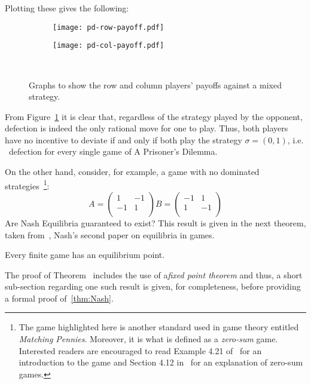 Plotting these gives the following:
\begin{figure}[h]
    \centering
        \begin{subfigure}[t]{0.45\textwidth}
        \centering
            \texttt{[image: pd-row-payoff.pdf]}
        \end{subfigure}
    \hfill
        \begin{subfigure}[t]{0.45\textwidth}
        \centering
            \texttt{[image: pd-col-payoff.pdf]}
        \end{subfigure}~\caption{Graphs to show the row and column players' payoffs against a 
        mixed strategy.}\label{fig:mixed_strategy_PD}
    \end{figure}
From Figure~\ref{fig:mixed_strategy_PD} it is clear that, regardless of the
strategy played by the opponent, defection is indeed the only rational move for
one to play. Thus, both players have no incentive to deviate if and only if both
play the strategy \(\sigma=(0, 1)\), i.e. \ defection for every single game of A
Prisoner's Dilemma.

On the other hand, consider, for example, a game with no dominated
strategies~\footnote{The game highlighted here is another standard used in game
theory entitled \emph{Matching Pennies}. Moreover, it is what is defined as a
\emph{zero-sum} game. Interested readers are encouraged to read Example 4.21
of~\cite{Webb2007} for an introduction to the game and Section 4.12
in~\cite{maschler_solan_zamir_2013} for an explanation of zero-sum games.}:
\[
    A =
    \begin{pmatrix}
        1 & -1\\
        -1 & 1\\
    \end{pmatrix}

    B =
    \begin{pmatrix}
        -1 & 1\\
        1 & -1\\
    \end{pmatrix}
\]
Are Nash Equilibria guaranteed to exist? This result is given in the next
theorem, taken from~\cite{nash1951non}, Nash's second paper on equilibria in 
games.

\begin{theorem}\label{thm:Nash}
    Every finite game has an equilibrium point.
\end{theorem}

The proof of Theorem~\label{thm:Nash} includes the use of a\emph{fixed point
theorem} and thus, a short sub-section regarding one such result is given, for
completeness, before providing a formal proof of~\ref{thm:Nash}.

